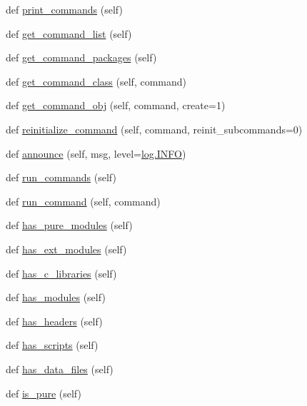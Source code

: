 \begin{DoxyCompactItemize}
\item 
def \hyperlink{classsetuptools_1_1__distutils_1_1dist_1_1Distribution_aa79c673a64b82f2eb74e97c81b9962ac}{print\+\_\+commands} (self)
\item 
def \hyperlink{classsetuptools_1_1__distutils_1_1dist_1_1Distribution_acf451fb2069d16d5f310ea4284c1f48e}{get\+\_\+command\+\_\+list} (self)
\item 
def \hyperlink{classsetuptools_1_1__distutils_1_1dist_1_1Distribution_a0a4e6195d41a730220461eefd9abb64b}{get\+\_\+command\+\_\+packages} (self)
\item 
def \hyperlink{classsetuptools_1_1__distutils_1_1dist_1_1Distribution_ae4d2002cf3e5eae8943b655ff03f1c9e}{get\+\_\+command\+\_\+class} (self, command)
\item 
def \hyperlink{classsetuptools_1_1__distutils_1_1dist_1_1Distribution_a30efa764f4c2927a684384bfa5bcb198}{get\+\_\+command\+\_\+obj} (self, command, create=1)
\item 
def \hyperlink{classsetuptools_1_1__distutils_1_1dist_1_1Distribution_a24f133bafe53add90f14ff703f89b0eb}{reinitialize\+\_\+command} (self, command, reinit\+\_\+subcommands=0)
\item 
def \hyperlink{classsetuptools_1_1__distutils_1_1dist_1_1Distribution_a85ea7f395fff4cb35acfc0bbd365d797}{announce} (self, msg, level=\hyperlink{namespacesetuptools_1_1__distutils_1_1log_ac111405ed4fed3ec19148ac2f8bbed1f}{log.\+I\+N\+FO})
\item 
def \hyperlink{classsetuptools_1_1__distutils_1_1dist_1_1Distribution_a380bd700672c35b06b2262836c2b1320}{run\+\_\+commands} (self)
\item 
def \hyperlink{classsetuptools_1_1__distutils_1_1dist_1_1Distribution_a69968cc68f4d05e9f6514dac1d9c013c}{run\+\_\+command} (self, command)
\item 
def \hyperlink{classsetuptools_1_1__distutils_1_1dist_1_1Distribution_a828f08754cf00c907714e5c19818f24b}{has\+\_\+pure\+\_\+modules} (self)
\item 
def \hyperlink{classsetuptools_1_1__distutils_1_1dist_1_1Distribution_a0b9beb164c8a4368dd70fb9bc02a504c}{has\+\_\+ext\+\_\+modules} (self)
\item 
def \hyperlink{classsetuptools_1_1__distutils_1_1dist_1_1Distribution_a5752ba9d34cc36a7d0cfc1fc24c4a2a4}{has\+\_\+c\+\_\+libraries} (self)
\item 
def \hyperlink{classsetuptools_1_1__distutils_1_1dist_1_1Distribution_aac14552c8fc989f7e8db4a8bc927ca00}{has\+\_\+modules} (self)
\item 
def \hyperlink{classsetuptools_1_1__distutils_1_1dist_1_1Distribution_a5f4913b5ca393699008607c310ef21b4}{has\+\_\+headers} (self)
\item 
def \hyperlink{classsetuptools_1_1__distutils_1_1dist_1_1Distribution_a43e5483e468ae47d556f62b0bc4cb546}{has\+\_\+scripts} (self)
\item 
def \hyperlink{classsetuptools_1_1__distutils_1_1dist_1_1Distribution_a3aa191012f55b50c77a4dc03e35c6db2}{has\+\_\+data\+\_\+files} (self)
\item 
def \hyperlink{classsetuptools_1_1__distutils_1_1dist_1_1Distribution_a2a9d74402d5641ace22d0ac70af869aa}{is\+\_\+pure} (self)
\end{DoxyCompactItemize}
